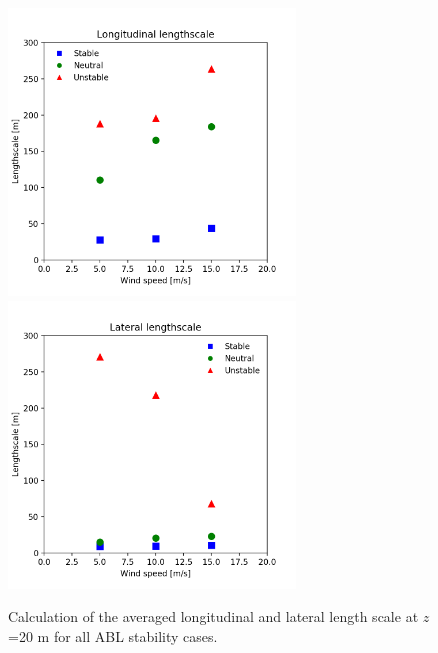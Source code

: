 \begin{figure}[hbt!]
  \centering
  \includegraphics[width=3in]{figures/AllStability_Rij_LongitudinalLengthscale.png}
  \includegraphics[width=3in]{figures/AllStability_Rij_LateralLengthscale.png}
  \caption{ \label{fig:AllStabilityLengthscale} Calculation of the
    averaged longitudinal and lateral length scale at $z$=20 m for all
    ABL stability cases.}
\end{figure}

